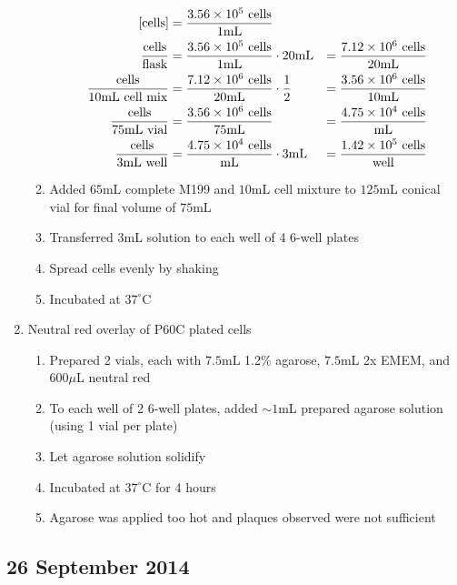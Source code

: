 \begin{enumerate}
\begin{enumerate}
				\begin{align*}
				\text{[cells]} &= \frac{3.56\times 10^{5}\text{ cells}}{1\text{mL}} \\
				\frac{\text{cells}}{\text{flask}} &= \frac{3.56\times 10^{5}\text{ cells}}{1\text{mL}} \cdot 20\text{mL} &= \frac{7.12\times 10^{6}\text{ cells}}{20\text{mL}}\\
				\frac{\text{cells}}{10\text{mL cell mix}} &= \frac{7.12\times 10^{6}\text{ cells}}{20\text{mL}}\cdot \frac{1}{2} &= \frac{3.56\times 10^{6}\text{ cells}}{10\text{mL}}\\
				\frac{\text{cells}}{75\text{mL vial}} &= \frac{3.56\times 10^{6}\text{ cells}}{75\text{mL}} &= \frac{4.75\times 10^{4}\text{ cells}}{\text{mL}}\\
				\frac{\text{cells}}{3\text{mL well}} &= \frac{4.75\times 10^{4}\text{ cells}}{\text{mL}} \cdot 3\text{mL} &= \frac{1.42\times 10^{5}\text{ cells}}{\text{well}}\\
				\end{align*}
			\item Added $65$mL complete M199 and $10$mL cell mixture to $125$mL conical vial for final volume of $75$mL
			\item Transferred $3$mL solution to each well of 4 6-well plates
			\item Spread cells evenly by shaking
			\item Incubated at $37^{\circ}$C
		\end{enumerate}
	\item Neutral red overlay of P60C plated cells
		\begin{enumerate}
			\item Prepared 2 vials, each with $7.5$mL 1.2\% agarose, $7.5$mL 2x EMEM, and $600\mu$L neutral red
			\item To each well of 2 6-well plates, added $\sim 1$mL prepared agarose solution (using 1 vial per plate)
			\item Let agarose solution solidify
			\item Incubated at $37^{\circ}$C for 4 hours
			\item Agarose was applied too hot and plaques observed were not sufficient
		\end{enumerate}
\end{enumerate}

\subsection*{26 September 2014}

